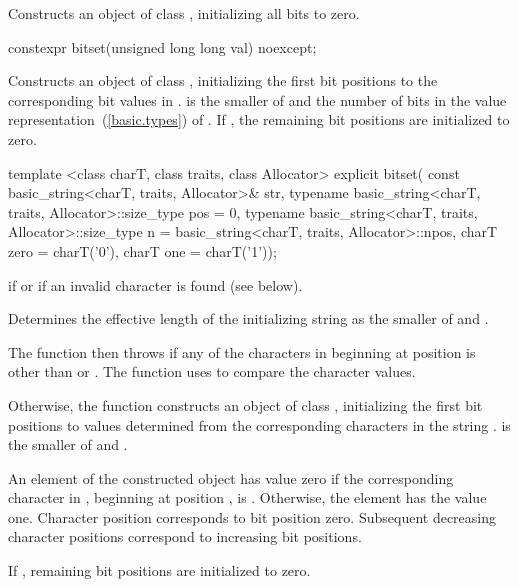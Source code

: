 \begin{itemdescr}
\pnum
\effects
Constructs an object of class
,
initializing all bits to zero.
\end{itemdescr}

%
\begin{itemdecl}
constexpr bitset(unsigned long long val) noexcept;
\end{itemdecl}

\begin{itemdescr}
\pnum
\effects
Constructs an object of class
,
initializing the first  bit positions to the corresponding bit
values in .
 is the smaller of  and the number of bits in the value
representation~(\ref{basic.types}) of .
If , the remaining bit positions are initialized to zero.
\end{itemdescr}

%
\begin{itemdecl}
template <class charT, class traits, class Allocator>
  explicit bitset(
    const basic_string<charT, traits, Allocator>& str,
    typename basic_string<charT, traits, Allocator>::size_type pos = 0,
    typename basic_string<charT, traits, Allocator>::size_type n
      = basic_string<charT, traits, Allocator>::npos,
    charT zero = charT('0'),
    charT one = charT('1'));
\end{itemdecl}

\begin{itemdescr}
\pnum
\throws
{}
if
or  if an invalid character is found (see below).%

\pnum
\effects
Determines the effective length
 of the initializing string as the smaller of
 and
.

The function then throws%
if any of the 
characters in  beginning at position  is
other than  or . The function uses 
to compare the character values.

Otherwise, the function constructs an object of class
,
initializing the first  bit
positions to values determined from the corresponding characters in the string
.
 is the smaller of  and .

\pnum
An element of the constructed object has value zero if the
corresponding character in , beginning at position
, is
.
Otherwise, the element has the value one.
Character position  corresponds to bit position zero.
Subsequent decreasing character positions correspond to increasing bit positions.

\pnum
If , remaining bit positions are initialized to zero.
\end{itemdescr}

